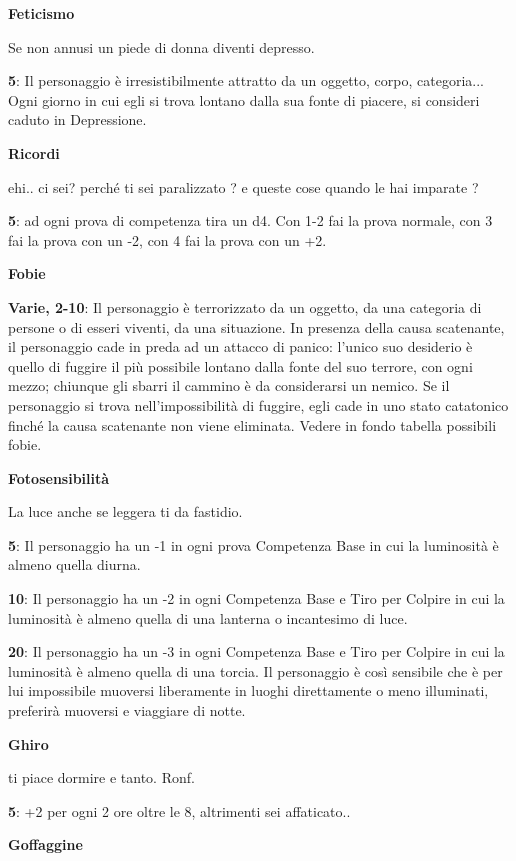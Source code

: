 \documentclass[a4paper,twoside,openany]{book}
\begin{document}
\begin{multicols}{2}
\textbf{Feticismo}

Se non annusi un piede di donna diventi depresso.

\textbf{5}: Il personaggio è irresistibilmente attratto da un oggetto, corpo, categoria... Ogni giorno in cui egli si trova lontano dalla sua fonte di piacere, si consideri caduto in Depressione.

\textbf{Ricordi}

ehi.. ci sei? perché ti sei paralizzato ? e queste cose quando le hai imparate ?

\textbf{5}: ad ogni prova di competenza tira un d4. Con 1-2 fai la prova normale, con 3 fai la prova con un -2, con 4 fai la prova con un +2.

\textbf{Fobie}

\textbf{Varie, 2-10}: Il personaggio è terrorizzato da un oggetto, da una categoria di persone o di esseri viventi, da una situazione. In presenza della causa scatenante, il personaggio cade in preda ad un attacco di panico: l'unico suo desiderio è quello di fuggire il più possibile lontano dalla fonte del suo terrore, con ogni mezzo; chiunque gli sbarri il cammino è da considerarsi un nemico. Se il personaggio si trova nell'impossibilità di fuggire, egli cade in uno stato catatonico finché la causa scatenante non viene eliminata. Vedere in fondo tabella possibili fobie.

\textbf{Fotosensibilità}

La luce anche se leggera ti da fastidio.

\textbf{5}: Il personaggio ha un -1 in ogni prova Competenza Base in cui la luminosità è almeno quella diurna.

\textbf{10}: Il personaggio ha un -2 in ogni Competenza Base e Tiro per Colpire in cui la luminosità è almeno quella di una lanterna o incantesimo di luce.

\textbf{20}: Il personaggio ha un -3 in ogni Competenza Base e Tiro per Colpire in cui la luminosità è almeno quella di una torcia.  Il personaggio è così sensibile che è per lui impossibile muoversi liberamente in luoghi direttamente o meno illuminati, preferirà muoversi e viaggiare di notte.

\textbf{Ghiro}

ti piace dormire e tanto. Ronf.

\textbf{5}: +2 per ogni 2 ore oltre le 8, altrimenti sei affaticato..

\textbf{Goffaggine}


\end{multicols}
\end{document}

